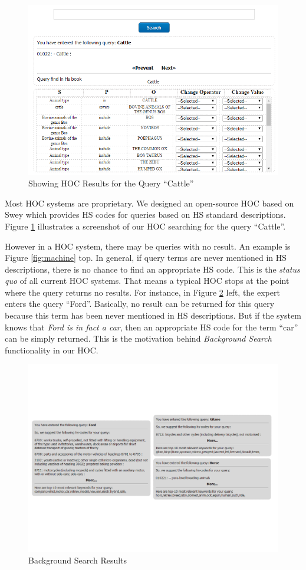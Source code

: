 \documentclass[conference]{IEEEtran}
\begin{document}
\begin{figure}[htpb]
\centerline{\includegraphics[width = .8\linewidth, keepaspectratio = true]{figs/claxper.png}}
\caption{\label{fig:claxper} Showing HOC Results for the Query ``Cattle''}
\end{figure}
 
Most HOC systems are proprietary. We designed an open-source HOC based on {\sc Swey} which provides HS codes for queries based on HS standard descriptions. Figure \ref{fig:claxper} illustrates a screenshot of our HOC searching for the query ``Cattle''.

However in a HOC system, there may be queries with no result. An example is Figure \ref{fig:machine} top. In general, if query terms are never mentioned in HS descriptions, there is no chance to find an appropriate HS code. This is the {\em status quo} of all current HOC systems. That means a typical HOC stops at the point where the query returns no results. For instance, in Figure \ref{fig:hs} left, the expert enters the query ``Ford''. Basically, no result can be returned for this query because this term has been never mentioned in HS descriptions. But if the system knows that {\em Ford is in fact a car}, then an appropriate HS code for the term ``car'' can be simply returned. This is the motivation behind {\em Background Search} functionality in our HOC. 

\begin{figure}[htpb]
\centerline{\includegraphics[width = .8\linewidth, keepaspectratio = true]{figs/hs.pdf}}
\caption{\label{fig:hs} Background Search Results}
\end{figure}
\end{document}
